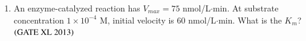 \documentclass[journal]{IEEEtran}
\begin{document}
\begin{enumerate}
\item An enzyme-catalyzed reaction  has $V_{max} = 75$ nmol/L$\cdot$min. At substrate concentration $1 \times 10^{-4}$ M, initial velocity is $60$ nmol/L$\cdot$min. What is the $K_m$?\hfill $\left(\text{GATE XL 2013}\right)$
\begin{enumerate}
\end{enumerate}
\end{enumerate}
\end{document}
